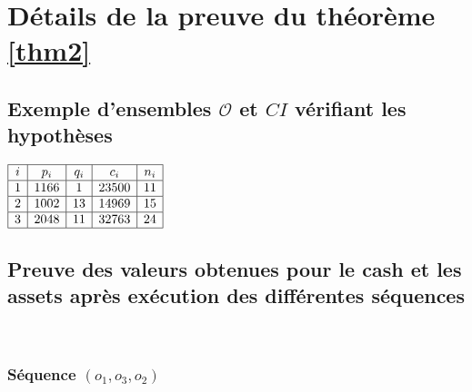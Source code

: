 \documentclass[a4paper]{article}
\newcommand{\Oc}{\mathcal{O}}
\newtheorem[style=S, bodystyle=\noindent]{thm}{Théorème}[section]
\newtheorem[style=S, bodystyle=\noindent]{defn}[thm]{Définition}
\newtheorem[style=S, bodystyle=\noindent]{propo}[thm]{Proposition}
\newtheorem[style=S, bodystyle=\noindent]{prop}[thm]{Propriété}
\newtheorem[style=S, bodystyle=\noindent]{coro}[thm]{Corollaire}
\newtheorem[style=S, bodystyle=\noindent]{lem}[thm]{Lemme}
\newtheorem[style=S, headstyle=\bfseries\boldmath Théorème, bodystyle=\noindent]{thm*}{Théorème}
\newtheorem[style=S, headstyle=\bfseries\boldmath Définition, bodystyle=\noindent]{defn*}{Définition}
\newtheorem[style=S, headstyle=\bfseries\boldmath Proposition, bodystyle=\noindent]{propo*}{Proposition}
\newtheorem[style=S, headstyle=\bfseries\boldmath Propriété, bodystyle=\noindent]{prop*}{Propriété}
\newtheorem[style=S, headstyle=\bfseries\boldmath Corollaire, bodystyle=\noindent]{coro*}{Corollaire}
\newtheorem[style=S, headstyle=\bfseries\boldmath Lemme, bodystyle=\noindent]{lem*}{Lemme}
\begin{document}
\section{Détails de la preuve du théorème \ref{thm2}}

\subsection{Exemple d'ensembles $\Oc$ et $CI$ vérifiant les hypothèses}
\label{appendix3}
\begin{center}
$\begin{array}{|c|c|c|c|c|}
	\hline
	i & p_i & q_i & c_i & n_i \\
	\hline
	1 & 1166 & 1 & 23500 & 11 \\
	\hline
	2 & 1002 & 13 & 14969 & 15 \\
	\hline
	3 & 2048 & 11 & 32763 & 24 \\
	\hline
\end{array}$
\end{center}

\subsection{Preuve des valeurs obtenues pour le cash et les assets après exécution des différentes séquences}
\label{appendix4}
~
\subsubsection{Séquence $(o_1,o_3,o_2)$}
\end{document}
